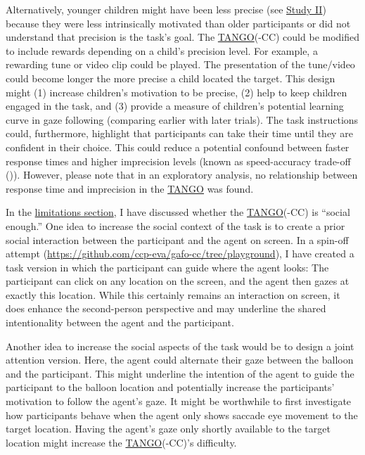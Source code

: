 \documentclass[
]{scrbook}
\begin{document}
Alternatively, younger children might have been less precise (see \hyperref[studyII]{Study II}) because they were less intrinsically motivated than older participants or did not understand that precision is the task's goal. The \hyperref[acronyms_TANGO]{TANGO}(-CC) could be modified to include rewards depending on a child's precision level. For example, a rewarding tune or video clip could be played. The presentation of the tune/video could become longer the more precise a child located the target. This design might (1) increase children's motivation to be precise, (2) help to keep children engaged in the task, and (3) provide a measure of children's potential learning curve in gaze following (comparing earlier with later trials). The task instructions could, furthermore, highlight that participants can take their time until they are confident in their choice. This could reduce a potential confound between faster response times and higher imprecision levels (known as speed-accuracy trade-off ()). However, please note that in an exploratory analysis, no relationship between response time and imprecision in the \hyperref[acronyms_TANGO]{TANGO} was found.

In the \hyperref[limitations]{limitations section}, I have discussed whether the \hyperref[acronyms_TANGO]{TANGO}(-CC) is ``social enough.'' One idea to increase the social context of the task is to create a prior social interaction between the participant and the agent on screen. In a spin-off attempt (\mbox{\url{https://github.com/ccp-eva/gafo-cc/tree/playground}}), I have created a task version in which the participant can guide where the agent looks: The participant can click on any location on the screen, and the agent then gazes at exactly this location. While this certainly remains an interaction on screen, it does enhance the second-person perspective and may underline the shared intentionality between the agent and the participant.

Another idea to increase the social aspects of the task would be to design a joint attention version. Here, the agent could alternate their gaze between the balloon and the participant. This might underline the intention of the agent to guide the participant to the balloon location and potentially increase the participants' motivation to follow the agent's gaze. It might be worthwhile to first investigate how participants behave when the agent only shows saccade eye movement to the target location. Having the agent's gaze only shortly available to the target location might increase the \hyperref[acronyms_TANGO]{TANGO}(-CC)'s difficulty.
\end{document}
